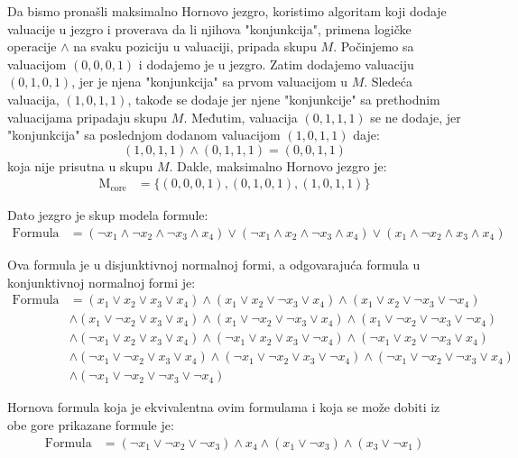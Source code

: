 \documentclass[12pt,oneside]{memoir}
\begin{document}
Da bismo pronašli maksimalno Hornovo jezgro, koristimo algoritam koji dodaje valuacije u jezgro i proverava da li njihova "konjunkcija", primena logičke operacije $\land$ na svaku poziciju u valuaciji, pripada skupu \(M\). Počinjemo sa valuacijom \((0, 0, 0, 1)\) i dodajemo je u jezgro. Zatim dodajemo valuaciju \((0, 1, 0, 1)\), jer je njena "konjunkcija" sa prvom valuacijom u \(M\). Sledeća valuacija, \((1, 0, 1, 1)\), takođe se dodaje jer njene "konjunkcije" sa prethodnim valuacijama pripadaju skupu \(M\). Međutim, valuacija \((0, 1, 1, 1)\) se ne dodaje, jer "konjunkcija" sa poslednjom dodanom valuacijom \((1, 0, 1, 1)\) daje:
\[
(1, 0, 1, 1) \land (0, 1, 1, 1) = (0, 0, 1, 1)
\] koja nije prisutna u skupu \(M\). Dakle, maksimalno Hornovo jezgro je:
\begin{align*}
\text{M}_{\text{core}} &= \{ (0, 0, 0, 1), (0, 1, 0, 1), (1, 0, 1, 1) \}
\end{align*}

Dato jezgro je skup modela formule:
\begin{align*}
\text{Formula} &= (\neg x_1 \land \neg x_2 \land \neg x_3 \land x_4) \lor (\neg x_1 \land  x_2 \land \neg x_3 \land x_4) \lor (x_1 \land \neg x_2 \land x_3 \land x_4)
\end{align*}

Ova formula je u disjunktivnoj normalnoj formi, a odgovarajuća formula u konjunktivnoj normalnoj formi je:
\begin{align*}
\text{Formula} &= (x_1 \lor x_2 \lor x_3 \lor x_4) \land (x_1 \lor x_2 \lor \neg x_3 \lor x_4) \land (x_1 \lor x_2 \lor \neg x_3 \lor \neg x_4) \\
& \land (x_1 \lor \neg x_2 \lor x_3 \lor x_4) \land (x_1 \lor \neg x_2 \lor \neg x_3 \lor x_4) \land (x_1 \lor \neg x_2 \lor \neg x_3 \lor \neg x_4) \\
& \land (\neg x_1 \lor x_2 \lor x_3 \lor x_4) \land (\neg x_1 \lor x_2 \lor x_3 \lor \neg x_4) \land (\neg x_1 \lor x_2 \lor \neg x_3 \lor x_4) \\
& \land (\neg x_1 \lor \neg x_2 \lor x_3 \lor x_4) \land (\neg x_1 \lor \neg x_2 \lor x_3 \lor \neg x_4) \land (\neg x_1 \lor \neg x_2 \lor \neg x_3 \lor x_4) \\
& \land (\neg x_1 \lor \neg x_2 \lor \neg x_3 \lor \neg x_4)
\end{align*}


Hornova formula koja je ekvivalentna ovim formulama i koja se može dobiti iz obe gore prikazane formule je:
\begin{align*}
\text{Formula} &= (\neg x_1 \lor \neg x_2 \lor \neg x_3) \land x_4 \land (x_1 \lor \neg x_3) \land (x_3 \lor \neg x_1)
\end{align*}
\end{document}

